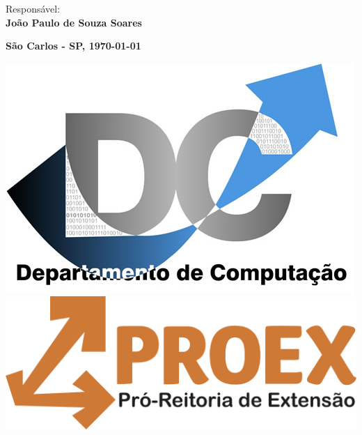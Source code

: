 \begin{center}
{\Large{ Responsável:  }}  \\
\textbf{\Large{João Paulo de Souza Soares}}  \\

\vspace*{10ex}

\textbf{\large São Carlos - SP, \today}

\vspace*{5ex}

\includegraphics[width=.25\textwidth]{../figuras/LogoDC} \hfill
\includegraphics[width=.25\textwidth]{../figuras/LogoProEx}

\end{center} 